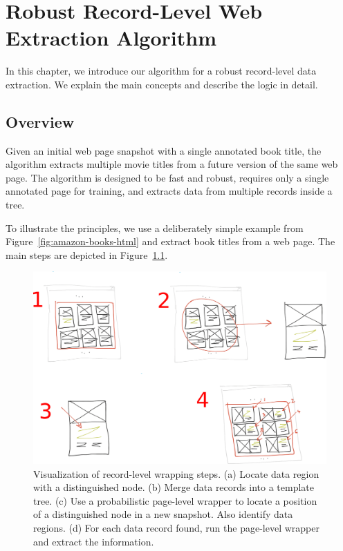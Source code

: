 \chapter{Robust Record-Level Web Extraction Algorithm}
\label{ch:algorithm}

In this chapter, we introduce our algorithm for a robust record-level data extraction. We explain the main concepts and describe the logic in detail.


\section{Overview}

Given an initial web page snapshot with a single annotated book title, the algorithm extracts multiple movie titles from a future version of the same web page. The algorithm is designed to be fast and robust, requires only a single annotated page for training, and extracts data from multiple records inside a tree.

To illustrate the principles, we use a deliberately simple example from Figure~\ref{fig:amazon-books-html} and extract book titles from a web page. The main steps are depicted in Figure~\ref{fig:algorithm}.

\begin{figure}[h]
	\centering
	\includegraphics[width=1.0\textwidth]{figures/algorithm}
	\caption{
		Visualization of record-level wrapping steps.
		(a) Locate data region with a distinguished node.
		(b) Merge data records into a template tree.
		(c) Use a probabilistic page-level wrapper to locate a position of a distinguished node in a new snapshot. Also identify data regions.
		(d) For each data record found, run the page-level wrapper and extract the information.
	}
	\label{fig:algorithm}
\end{figure}

